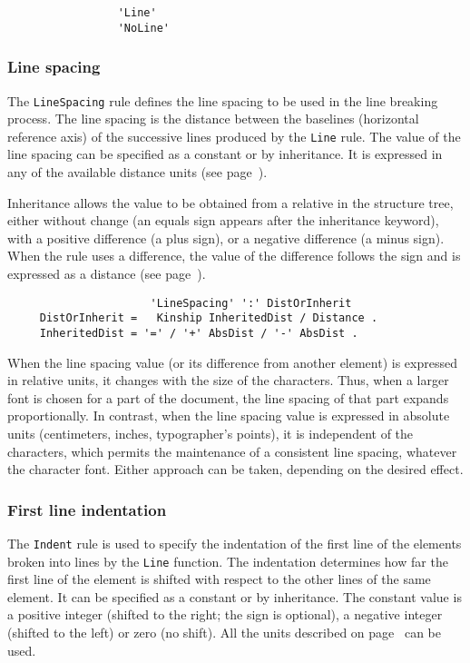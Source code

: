 \begin{verbatim}
                 'Line'
                 'NoLine'
\end{verbatim}

\subsubsection{Line spacing}
\label{interligne}

The {\tt LineSpacing} rule defines the line spacing to be used in the
line breaking process.  The line spacing is the distance between the
baselines (horizontal reference axis) of the successive lines produced
by the {\tt Line} rule.  The value of the line spacing can be
specified as a constant or by inheritance.  It is expressed in any of
the available distance units (see page~\pageref{unites}).

Inheritance allows the value to be obtained from a relative in the
structure tree, either without change (an equals sign appears after
the inheritance keyword), with a positive difference (a plus sign), or
a negative difference (a minus sign).  When the rule uses a
difference, the value of the difference  follows the sign and is
expressed as a distance (see page~\pageref{unites}).

\begin{verbatim}
                      'LineSpacing' ':' DistOrInherit
     DistOrInherit =   Kinship InheritedDist / Distance .
     InheritedDist = '=' / '+' AbsDist / '-' AbsDist .
\end{verbatim}

When the line spacing value (or its difference from another element)
is expressed in relative units, it changes with the size of the
characters.  Thus, when a larger font is chosen for a part of the
document, the line spacing of that part expands proportionally.  In
contrast, when the line spacing value is expressed in absolute units
(centimeters, inches, typographer's points), it is independent of the
characters, which permits the maintenance of a consistent line
spacing, whatever the character font.  Either approach can be taken,
depending on the desired effect.

\subsubsection{First line indentation}

The {\tt Indent} rule is used to specify the indentation of the first
line of the elements broken into lines by the {\tt Line} function.
The indentation determines how far the first line of the element is
shifted with respect to the other lines of the same element.  It can
be specified as a constant or by inheritance.  The constant value is
a positive integer (shifted to the right; the sign is optional), a
negative integer (shifted to the left) or zero (no shift).  All the
units described on page~\pageref{unites} can be used.

